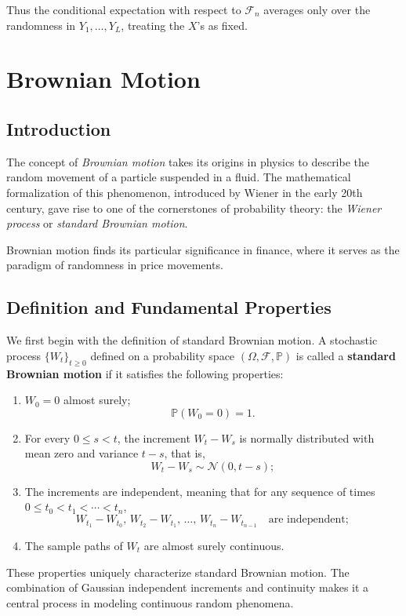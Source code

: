 Thus the conditional expectation with respect to $\mathcal{F}_n$ averages only over the randomness in $Y_1,\ldots,Y_L$, treating the $X$'s as fixed.

\section{Brownian Motion}\label{sec:brownian-motion}
\subsection{Introduction}
The concept of \textit{Brownian motion} takes its origins in physics to describe the random movement of a particle suspended in a fluid. The mathematical formalization of this phenomenon, introduced by Wiener in the early 20th century, gave rise to one of the cornerstones of probability theory: the \textit{Wiener process} or \textit{standard Brownian motion}.

Brownian motion finds its particular significance in finance, where it serves as the paradigm of randomness in price movements.
\subsection{Definition and Fundamental Properties}

We first begin with the definition of standard Brownian motion. A stochastic process \( \{W_t\}_{t \geq 0} \) defined on a probability space \( (\Omega, \mathcal{F}, \mathbb{P}) \) is called a \textbf{standard Brownian motion} if it satisfies the following properties:
\begin{enumerate}
    \item \( W_0 = 0 \) almost surely;
    \[
    \mathbb P(W_0=0)=1.
    \]
    \item For every \( 0 \leq s < t \), the increment \( W_t - W_s \) is normally distributed with mean zero and variance \( t - s \), that is,
    \[
    W_t - W_s \sim \mathcal{N}(0, t-s);
    \]
    \item The increments are independent, meaning that for any sequence of times \( 0 \leq t_0 < t_1 < \cdots < t_n \),
    \[
    W_{t_1} - W_{t_0}, \, W_{t_2} - W_{t_1}, \, \ldots, \, W_{t_n} - W_{t_{n-1}}
    \quad \text{are independent};
    \]
    \item The sample paths of \( W_t \) are almost surely continuous.
\end{enumerate}


These properties uniquely characterize standard Brownian motion. The combination of Gaussian independent increments and continuity makes it a central process in modeling continuous random phenomena.

